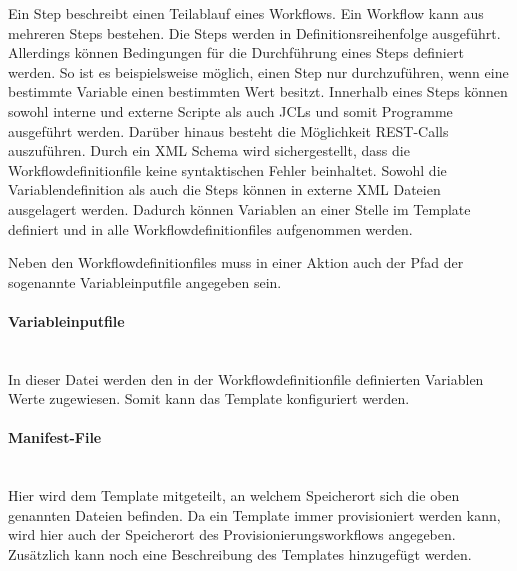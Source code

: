 Ein Step beschreibt einen Teilablauf eines Workflows.
Ein Workflow kann aus mehreren Steps bestehen.
Die Steps werden in Definitionsreihenfolge ausgeführt.
Allerdings können Bedingungen für die Durchführung eines Steps definiert werden.
So ist es beispielsweise möglich, einen Step nur durchzuführen, wenn eine bestimmte Variable einen bestimmten Wert besitzt.
Innerhalb eines Steps können sowohl interne und externe Scripte als auch JCLs und somit Programme ausgeführt werden.
Darüber hinaus besteht die Möglichkeit REST-Calls auszuführen.
Durch ein XML Schema wird sichergestellt, dass die Workflowdefinitionfile keine syntaktischen Fehler beinhaltet.
Sowohl die Variablendefinition als auch die Steps können in externe XML Dateien ausgelagert werden.
Dadurch können Variablen an einer Stelle im Template definiert und in alle Workflowdefinitionfiles aufgenommen werden.
\cite{Rotthove.2018}

Neben den Workflowdefinitionfiles muss in einer Aktion auch der Pfad der sogenannte \glqq Variableinputfile\grqq{} angegeben sein.

\paragraph{\glqq Variableinputfile\grqq} ~\\
In dieser Datei werden den in der Workflowdefinitionfile definierten Variablen Werte zugewiesen.
Somit kann das Template konfiguriert werden.

\paragraph{\glqq Manifest-File\grqq} ~\\
Hier wird dem Template mitgeteilt, an welchem Speicherort sich die oben genannten Dateien befinden.
Da ein Template immer provisioniert werden kann, wird hier auch der Speicherort des Provisionierungsworkflows angegeben.
Zusätzlich kann noch eine Beschreibung des Templates hinzugefügt werden.
\cite{IBM.2019}

